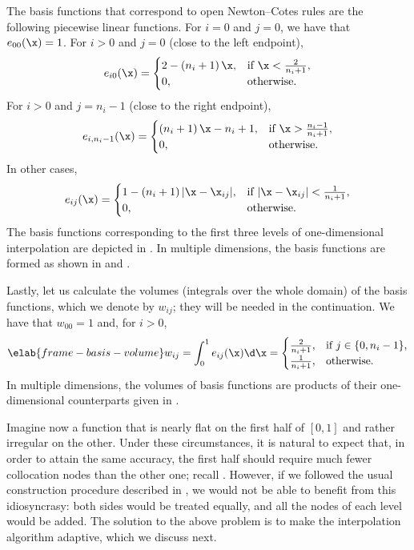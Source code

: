 The basis functions that correspond to open Newton--Cotes rules are the
following piecewise linear functions. For $i = 0$ and $j = 0$, we have that
$e_{00}(\x) = 1$. For $i > 0$ and $j = 0$ (close to the left endpoint),
\[
  e_{i0}(\x) =
  \begin{cases}
    2 - \left(n_i + 1\right) \x, & \text{if } \x < \frac{2}{n_i + 1}, \\
    0, & \text{otherwise}.
  \end{cases}
\]
For $i > 0$ and $j = n_i - 1$ (close to the right endpoint),
\[
  e_{i, n_i - 1}(\x) =
  \begin{cases}
    \left(n_i + 1\right) \x - n_i + 1, & \text{if } \x > \frac{n_i - 1}{n_i + 1}, \\
    0, & \text{otherwise}.
  \end{cases}
\]
In other cases,
\[
  e_{ij}(\x) =
  \begin{cases}
    1 - \left(n_i + 1\right)|\x - \x_{ij}|, & \text{if } |\x - \x_{ij}| < \frac{1}{n_i + 1}, \\
    0, & \text{otherwise}.
  \end{cases}
\]
The basis functions corresponding to the first three levels of one-dimensional
interpolation are depicted in . In multiple dimensions, the
basis functions are formed as shown in  and
.

Lastly, let us calculate the volumes (integrals over the whole domain) of the
basis functions, which we denote by $w_{ij}$; they will be needed in the
continuation. We have that $w_{00} = 1$ and, for $i > 0$,
\begin{equation} \elab{frame-basis-volume}
  w_{ij} = \int_0^1 e_{ij}(\x) \d \x =
  \begin{cases}
    \frac{2}{n_i + 1}, & \text{if } j \in \{ 0, n_i - 1 \}, \\
    \frac{1}{n_i + 1}, & \text{otherwise}.
  \end{cases}
\end{equation}
In multiple dimensions, the volumes of basis functions are products of their
one-dimensional counterparts given in .

Imagine now a function that is nearly flat on the first half of $[0, 1]$ and
rather irregular on the other. Under these circumstances, it is natural to
expect that, in order to attain the same accuracy, the first half should require
much fewer collocation nodes than the other one; recall .
However, if we followed the usual construction procedure described in
, we would not be able to benefit from this
idiosyncrasy: both sides would be treated equally, and all the nodes of each
level would be added. The solution to the above problem is to make the
interpolation algorithm adaptive, which we discuss next.

